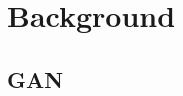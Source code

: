\documentclass{article} %
\newcommand{\<}{\left\langle}
\renewcommand{\>}{\right\rangle}
\begin{document}





\section{Background}

\subsection{GAN}
\end{document}
